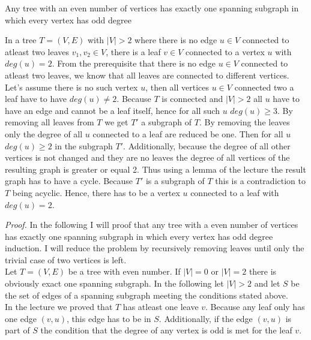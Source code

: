 \documentclass[a4paper]{article}
\begin{document}
	\begin{solution}{6}
		\begin{theorem}{Any tree with an even number of vertices has exactly one spanning subgraph in which every vertex has odd degree}
	
			\begin{lemma}{In a tree $T=(V,E)$ with $|V|>2$ where there is no edge $u \in V$ connected to atleast two leaves $v_1, v_2 \in V$, there is a leaf $v \in V$ connected to a vertex $u$ with $deg(u) = 2$.}
				From the prerequisite that there is no edge $u \in V$ connected to atleast two leaves, we know that all leaves are connected to different vertices. 
				Let's assume there is no such vertex $u$, then all vertices $u \in V$ connected two a leaf have to have $deg(u) \neq 2$. 
				Because $T$ is connected and $|V|>2$ all $u$ have to have an edge and cannot be a leaf itself, hence for all such $u$ $deg(u) \geq 3$. 
				By removing all leaves from $T$ we get $T'$ a subgraph of $T$. By removing the leaves only the degree of all $u$ connected to a leaf are reduced be one. 
				Then for all $u$ $deg(u) \geq 2$ in the subgraph $T'$. 
				Additionally, because the degree of all other vertices is not changed and they are no leaves the degree of all vertices of the resulting graph is greater or equal 2. 
				Thus using a lemma of the lecture the result graph has to have a cycle. 
				Because $T'$ is a subgraph of $T$ this is a contradiction to $T$ being acyclic. 
				Hence, there has to be a vertex $u$ connected to a leaf with $deg(u)=2$. 		
			\end{lemma}

			\emph{Proof.} In the following I will proof that any tree with a even number of vertices has exactly one spanning subgraph in which every vertex has odd degree induction. I will reduce the problem by recursively removing leaves until only the trivial case of two vertices is left. \\

			Let $T=(V, E)$ be a tree with even number. If $|V|=0$ or $|V|=2$ there is obviously exact one spanning subgraph. 
			In the following let $|V|>2$ and let $S$ be the set of edges of a spanning subgraph meeting the conditions stated above. \\
			In the lecture we proved that $T$ has atleast one leave $v$. 
			Because any leaf only has one edge $(v,u)$, this edge has to be in $S$. 
			Additionally, if the edge $(v,u)$ is part of $S$ the condition that the degree of any vertex is odd is met for the leaf $v$. 
				

\end{theorem}
\end{solution}
\end{document}
